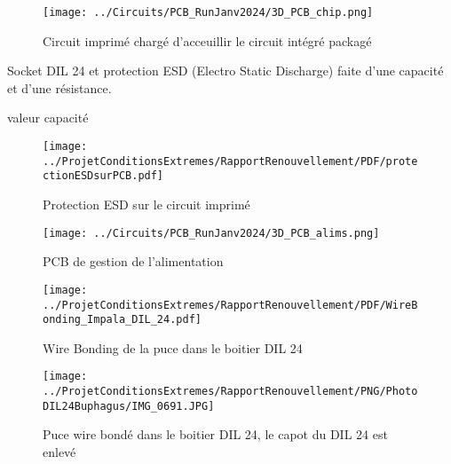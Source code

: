 \begin{figure}
    \centering
    \texttt{[image: ../Circuits/PCB\_RunJanv2024/3D\_PCB\_chip.png]}
    \caption{Circuit imprimé chargé d'acceuillir le circuit intégré packagé}
    \label{fig:PCB_Buphagus}
\end{figure}

Socket DIL 24 et protection ESD (Electro Static Discharge) faite d'une capacité et d'une résistance.
\begin{metsUneSource}
valeur capacité
\end{metsUneSource}

\begin{figure}
    \centering
    \texttt{[image: ../ProjetConditionsExtremes/RapportRenouvellement/PDF/protectionESDsurPCB.pdf]}
    \caption{Protection ESD sur le circuit imprimé}
    \label{fig:protection_ESD_sur_PCB} 
\end{figure}

\begin{figure}
    \centering
    \texttt{[image: ../Circuits/PCB\_RunJanv2024/3D\_PCB\_alims.png]}
    \caption{PCB de gestion de l'alimentation}
    \label{fig:PCB_alimsBuphagus}
\end{figure}

\begin{figure}
    \centering
    \texttt{[image: ../ProjetConditionsExtremes/RapportRenouvellement/PDF/WireBonding\_Impala\_DIL\_24.pdf]}
    \caption{Wire Bonding de la puce dans le boitier DIL 24}
    \label{fig:WB_Buphagus}
\end{figure}

\begin{figure}
    \centering
    \texttt{[image: ../ProjetConditionsExtremes/RapportRenouvellement/PNG/PhotoDIL24Buphagus/IMG\_0691.JPG]}
    \caption{Puce wire bondé dans le boitier DIL 24, le capot du DIL 24 est enlevé}
    \label{fig:puce_Buphagus_noLid}
\end{figure}